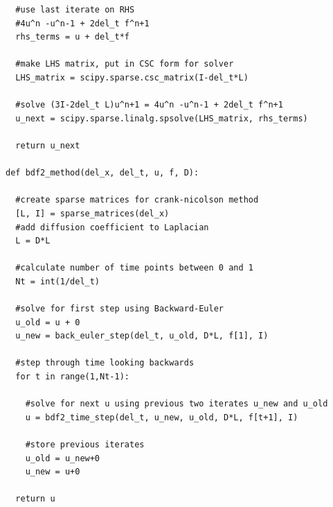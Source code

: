 \documentclass[12pt]{article}
\begin{document}
\begin{verbatim}
  #use last iterate on RHS
  #4u^n -u^n-1 + 2del_t f^n+1
  rhs_terms = u + del_t*f

  #make LHS matrix, put in CSC form for solver
  LHS_matrix = scipy.sparse.csc_matrix(I-del_t*L)

  #solve (3I-2del_t L)u^n+1 = 4u^n -u^n-1 + 2del_t f^n+1
  u_next = scipy.sparse.linalg.spsolve(LHS_matrix, rhs_terms)

  return u_next

def bdf2_method(del_x, del_t, u, f, D):

  #create sparse matrices for crank-nicolson method
  [L, I] = sparse_matrices(del_x)
  #add diffusion coefficient to Laplacian
  L = D*L

  #calculate number of time points between 0 and 1
  Nt = int(1/del_t)

  #solve for first step using Backward-Euler
  u_old = u + 0
  u_new = back_euler_step(del_t, u_old, D*L, f[1], I)
  
  #step through time looking backwards
  for t in range(1,Nt-1):

    #solve for next u using previous two iterates u_new and u_old
    u = bdf2_time_step(del_t, u_new, u_old, D*L, f[t+1], I)
    
    #store previous iterates
    u_old = u_new+0
    u_new = u+0

  return u
\end{verbatim}
\end{document}
